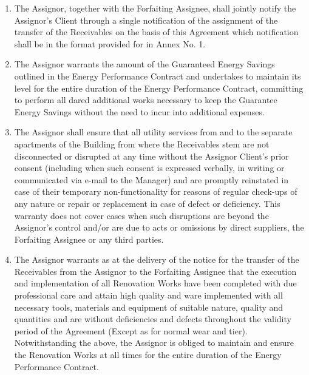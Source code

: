 \documentclass[a4paper]{article}
\begin{document}
\begin{multicols}{2}
\begin{enumerate}
  \item{The Assignor, together with the Forfaiting Assignee, shall
      jointly notify the Assignor’s Client through a single
      notification of the assignment of the transfer of the
      Receivables on the basis of this Agreement which notification
      shall be in the format provided for in Annex No. 1.}

  \item{The Assignor warrants the amount of the Guaranteed Energy
      Savings outlined in the Energy Performance Contract and
      undertakes to maintain its level for the entire duration of the
      Energy Performance Contract, committing to perform all dared
      additional works necessary to keep the Guarantee Energy Savings
      without the need to incur into additional expenses.}

  \item{The Assignor shall ensure that all utility services from and
      to the separate apartments of the Building from where the
      Receivables stem are not disconnected or disrupted at any time
      without the Assignor Client’s prior consent (including when such
      consent is expressed verbally, in writing or communicated via
      e{-}mail to the Manager) and are promptly reinstated in case of
      their temporary non{-}functionality for reasons of regular
      check{-}ups of any nature or repair or replacement in case of
      defect or deficiency. This warranty does not cover cases when
      such disruptions are beyond the Assignor’s control and/or are
      due to acts or omissions by direct suppliers, the Forfaiting
      Assignee or any third parties.}

  \item{The Assignor warrants as at the delivery of the notice for the
      transfer of the Receivables from the Assignor to the Forfaiting
      Assignee that the execution and implementation of all Renovation
      Works have been completed with due professional care and attain
      high quality and ware implemented with all necessary tools,
      materials and equipment of suitable nature, quality and
      quantities and are without deficiencies and defects throughout
      the validity period of the Agreement (Except as for normal wear
      and tier). Notwithstanding the above, the Assignor is obliged to
      maintain and ensure the Renovation Works at all times for the
      entire duration of the Energy Performance Contract.}


\end{enumerate}
\end{multicols}
\end{document}
